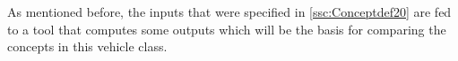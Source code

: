 As mentioned before, the inputs that were specified in \autoref{ssc:Conceptdef20} are fed to a tool that computes some outputs which will be the basis for comparing the concepts in this vehicle class.  



